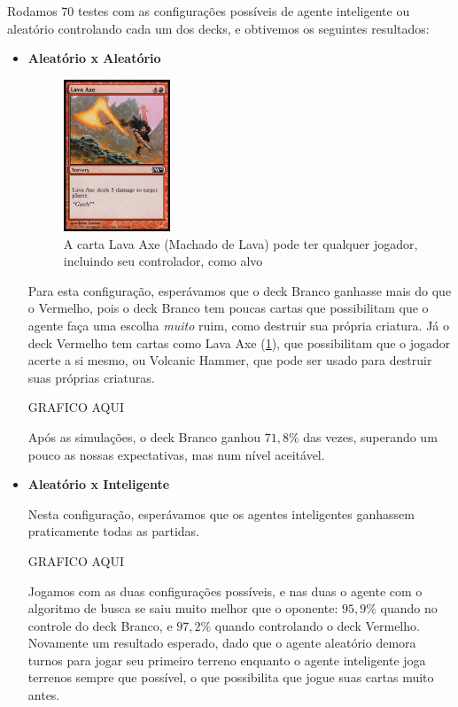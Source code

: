Rodamos 70 testes com as configurações possíveis de agente inteligente ou aleatório controlando cada um dos decks, e obtivemos os seguintes resultados:

\begin{itemize}
\item \textbf{Aleatório x Aleatório}

\begin{figure}[!ht]
    \centering
    \includegraphics[width=0.3\textwidth]{picstcc/lavaaxe.jpg}
    \caption{A carta Lava Axe (Machado de Lava) pode ter qualquer jogador, incluindo seu controlador, como alvo}
    \label{lavaaxe}
\end{figure}

Para esta configuração, esperávamos que o deck Branco ganhasse mais do que o Vermelho, pois o deck Branco tem poucas cartas que possibilitam que o agente faça uma escolha \textit{muito} ruim, como destruir sua própria criatura. Já o deck Vermelho tem cartas como Lava Axe (\ref{lavaaxe}), que possibilitam que o jogador acerte a si mesmo, ou Volcanic Hammer, que pode ser usado para destruir suas próprias criaturas.

GRAFICO AQUI

Após as simulações, o deck Branco ganhou $71,8\%$ das vezes, superando um pouco as nossas expectativas, mas num nível aceitável.

\item \textbf{Aleatório x Inteligente}

Nesta configuração, esperávamos que os agentes inteligentes ganhassem praticamente todas as partidas.

GRAFICO AQUI

Jogamos com as duas configurações possíveis, e nas duas o agente com o algoritmo de busca se saiu
muito melhor que o oponente: $95,9\%$ quando no controle do deck Branco, e $97,2\%$ quando controlando o deck Vermelho. Novamente um resultado esperado, dado que o agente aleatório demora turnos para jogar seu primeiro terreno enquanto o agente inteligente joga terrenos sempre que possível, o que possibilita que jogue suas cartas muito antes.


\end{itemize}
